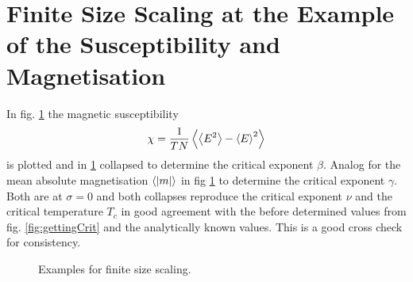 \section{Finite Size Scaling at the Example of the Susceptibility and Magnetisation}
\label{appendix:finiteSizeScaling}
    In fig. \ref{fig:gettingCrit:appendix}
    the magnetic susceptibility
    \[\chi = \frac{1}{TN}\left< \left< E^2 \right> - \left< E \right>^2 \right>\]
    is plotted and in \ref{fig:gettingCrit:appendix}
    collapsed to determine the critical exponent \(\beta\).
    Analog for the mean absolute magnetisation \(\left< \left\vert m\right\vert \right>\) in fig \ref{fig:gettingCrit:appendix}
    to determine the critical exponent \(\gamma\).
    Both are at \(\sigma=0\) and
    both collapses reproduce the  critical exponent \(\nu\) and the
    critical temperature \(T_c\) in good agreement with the before determined
    values from fig. \ref{fig:gettingCrit}
    and the analytically known values. This is a good cross check
    for consistency.
    \begin{figure}[htbp]
        \centering
        \caption[Examples of determining critical temperature and exponents]
        {
            Examples for finite size scaling.
        }
        \label{fig:gettingCrit:appendix}
    \end{figure}
